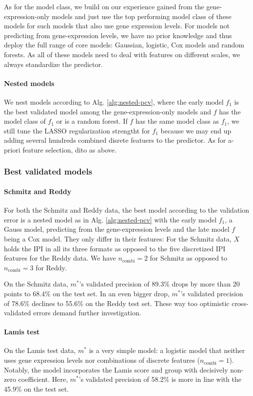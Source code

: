 As for the model class, we build on our experience gained from the gene-expression-only models and 
just use the top performing model class of these models for such models that also use gene 
expression levels. For models not predicting from gene-expression levels, we have no prior 
knowledge and thus deploy the full range of core models: Gaussian, logistic, Cox models and random 
forests. As all of these models need to deal with features on different scales, we always 
standardize the predictor.


\paragraph{Nested models}
We nest models according to Alg. \ref{alg:nested-pcv}, where the early model $f_1$ is the best 
validated model among the gene-expression-only models and $f$ has the model class of $f_1$ or is 
a random forest. If $f$ has the same model class as $f_1$, we still tune the LASSO regularization 
strengtht for $f_1$ because we may end up adding several hundreds combined disrete featuers to the 
predictor. As for a-priori feature selection, dito as above.

\subsubsection{Best validated models}

\paragraph{Schmitz and Reddy}
For both the Schmitz and Reddy data, the best model according to the validation error is a nested 
model as in Alg. \ref{alg:nested-pcv} with the early model $f_1$, a Gauss model, predicting from 
the gene-expression levels and the late model $f$ being a Cox model. They only differ in their 
features: For the Schmitz data, $X$ holds the IPI in all its three formats as opposed to the five 
discretized IPI features for the Reddy data. We have $n_\text{combi} = 2$ for Schmitz as opposed to 
$n_\text{combi} = 3$ for Reddy.

On the Schmitz data, $m^*$'s validated precision of \num{89.3}\% drops by more than \num{20} points 
to \num{68.4}\% on the test set. In an even bigger drop, $m^*$'s validated precision of \num{78.6}\% 
declines to \num{55.6}\% on the Reddy test set. These way too optimistic cross-validated errors 
demand further investigation.

\paragraph{Lamis test}
On the Lamis test data, $m^*$ is a very simple model: a logistic model that neither uses gene 
expression levels nor combinations of discrete features ($n_\text{combi} = 1$). Notably, the model
incorporates the Lamis score and group with decisively non-zero coefficient. Here, $m^*$'s 
validated precision of \num{58.2}\% is more in line with the \num{45.9}\% on the test set.

